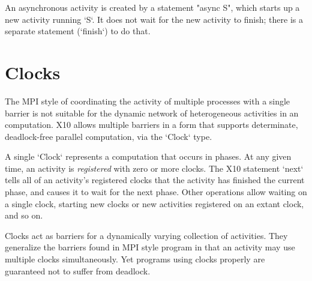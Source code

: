 An asynchronous activity is created by a statement \xcd"async S", which starts
up a new activity running \xcd`S`.  It does not wait for the new activity to
finish; there is a separate statement (\xcd`finish`) to do that.




\section{Clocks}
The MPI style of coordinating the activity of multiple processes with
a single barrier is not suitable for the dynamic network of heterogeneous
activities in an \Xten{} computation.  
X10 allows multiple barriers in a form that supports determinate,
deadlock-free parallel computation, via the \xcd`Clock` type.

A single \xcd`Clock` represents a computation that occurs in phases.
At any given time, an activity is {\em registered} with zero or more clocks.
The X10 statement \xcd`next` tells all of an activity's registered clocks that
the activity has finished the current phase, and causes it to wait for the
next phase.  Other operations allow waiting on a single clock, starting
new clocks or new activities registered on an extant clock, and so on. 


Clocks act as {barriers} for a dynamically varying collection of activities.
They generalize the barriers found in MPI style program in that an activity
may use multiple clocks simultaneously. Yet programs using clocks properly are
guaranteed not to suffer from deadlock.

